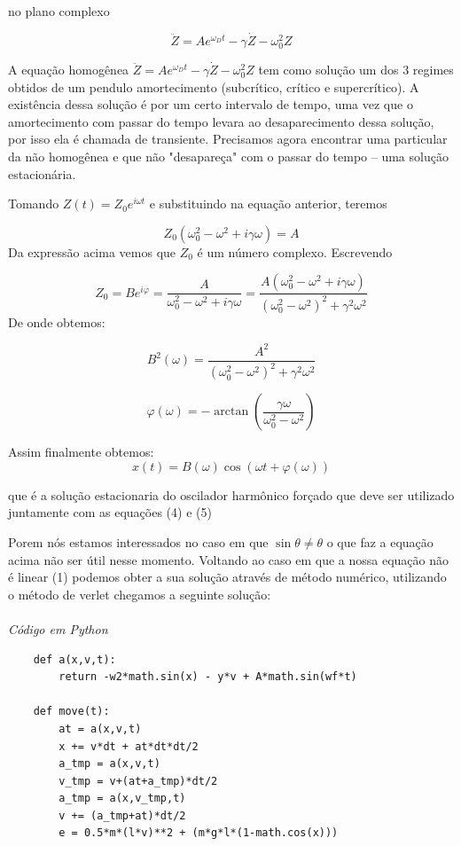 \documentclass[dvipsnames,a4paper,11pt]{article}
\begin{document}
no plano complexo

\[\ddot{Z} = Ae^{\omega_D{t}} -\gamma\dot{Z} -\omega_{0}^2Z\]

A equação homogênea $\ddot{Z} = Ae^{\omega_D{t}} -\gamma\dot{Z} -\omega_{0}^2Z$ tem como solução um dos 3 regimes obtidos de um pendulo amortecimento (subcrítico, crítico e supercrítico). A existência dessa solução é por um certo intervalo de tempo, uma vez que o amortecimento com passar do tempo levara ao desaparecimento dessa solução, por isso ela é chamada de transiente.
Precisamos agora encontrar uma particular da não homogênea e que não "desapareça"  com o passar do tempo – uma solução estacionária.

Tomando $Z(t) = Z_0e^{i\omega{t}}$ e substituindo na equação anterior, teremos

\begin{equation}
	Z_0(\omega_0^2 - \omega^2 + i\gamma\omega) = A
\end{equation}
Da expressão acima vemos que $Z_0$ é um número complexo. Escrevendo

\[Z_0 = Be^{i\varphi} = \frac{A}{\omega_0^2 - \omega^2 + i\gamma\omega} = \frac{A(\omega_0^2 - \omega^2 + i\gamma\omega)}{(\omega_0^2 - \omega^2)^2 + \gamma^2\omega^2}\]
De onde obtemos:

\begin{equation}
	B^2(\omega) = \frac{A^2}{(\omega_0^2 - \omega^2)^2 + \gamma^2\omega^2}
\end{equation}

\begin{equation}
	\varphi(\omega) = -\arctan\left(\frac{\gamma\omega}{\omega_{0}^2 - \omega^2}\right)
\end{equation}

Assim finalmente obtemos:
\begin{equation}
	x(t) = B(\omega)\cos(\omega{t} + \varphi(\omega))
\end{equation}

que é a solução estacionaria do oscilador harmônico forçado que deve ser utilizado juntamente com as equações (4) e (5)

Porem nós estamos interessados no caso em que $\sin\theta \neq \theta$ o que faz a equação acima não ser útil nesse momento. Voltando ao caso em que a nossa equação não é linear (1) podemos obter a sua solução através de método numérico, utilizando o método de verlet chegamos a seguinte solução:

\paragraph{}
\textit{Código em Python}
\begin{lstlisting}
	def a(x,v,t):
		return -w2*math.sin(x) - y*v + A*math.sin(wf*t)
	
	def move(t):
		at = a(x,v,t)
		x += v*dt + at*dt*dt/2
		a_tmp = a(x,v,t)
		v_tmp = v+(at+a_tmp)*dt/2 
		a_tmp = a(x,v_tmp,t)
		v += (a_tmp+at)*dt/2
		e = 0.5*m*(l*v)**2 + (m*g*l*(1-math.cos(x)))
\end{lstlisting}
\end{document}
